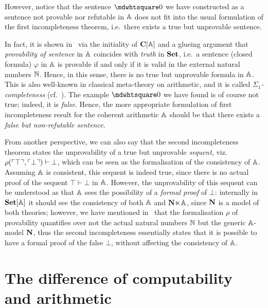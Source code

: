 \begin{remark}
  However, notice that the sentence $\bx 0$ we have constructed as a sentence not provable nor refutable in $\mathbb{A}$ does not fit into the usual formulation of the first incompleteness theorem, i.e.\ there exists a true but unprovable sentence.

  In fact, it is shown in~\citet{ye_categorical_2026} via the initiality of $\mathbf{C}[\mathbb{A}]$ and a glueing argument that \emph{provability of sentence} in $\mathbb{A}$ coincides with \emph{truth} in $\mathbf{Set}$, i.e.\ a sentence (closed formula) $\varphi$ in $\mathbb{A}$ is provable if and only if it is valid in the external natural numbers $\mathbb{N}$. Hence, in this sense, there is no true but unprovable formula in $\mathbb{A}$. This is also well-known in classical meta-theory on arithmetic, and it is called \emph{$\Sigma_1$-completeness} (cf.~\citet[Thm.~I.1.8]{Hájek_Pudlák_2017}). The example $\bx 0$ we have found is of course not true; indeed, it is \emph{false}. Hence, the more appropriate formulation of first incompleteness result for the coherent arithmetic $\mathbb{A}$ should be that there exists a \emph{false but non-refutable sentence}.
\end{remark}

\begin{remark}
  From another perspective, we can also say that the second incompleteness theorem states the unprovability of a true but unprovable \emph{sequent}, viz.\ $\rho(\ulcorner \top \urcorner,\ulcorner \bot \urcorner) \vdash \bot$, which can be seen as the formalisation of the consistency of $\mathbb{A}$. Assuming $\mathbb{A}$ is consistent, this sequent is indeed true, since there is no actual proof of the sequent $\top \vdash \bot$ in $\mathbb{A}$. However, the unprovability of this sequent can be understood as that $\mathbb{A}$ sees the possibility of a \emph{formal proof} of $\bot$: internally in $\mathbf{Set}[\mathbb{A}]$ it should see the consistency of both $\mathbb{A}$ and $\mathbf N\hspace{-.4ex}\ltimes\hspace{-.4ex}\mathbb{A}$, since $\mathbf N$ is a model of both theories; however, we have mentioned in~ that the formalisation $\rho$ of provability quantifies over not the actual natural numbers $\mathbb{N}$ but the generic $\mathbb{A}$-model $\mathbf N$, thus the second incompleteness essentially states that it is possible to have a formal proof of the false $\bot$, without affecting the consistency of $\mathbb{A}$.
\end{remark}

\section{The difference of computability and arithmetic}\label{sec:ariandcomp}

